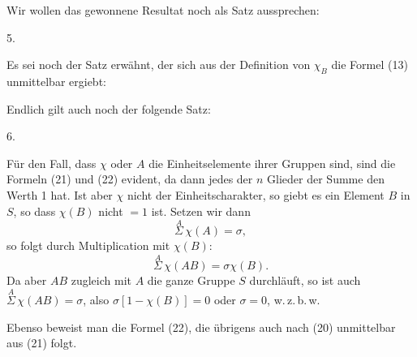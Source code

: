 
Wir wollen das gewonnene Resultat noch als Satz aussprechen:

5. 

Es sei noch der Satz erwähnt, der sich aus der Definition von $\chi_B$  die Formel (13) unmittelbar ergiebt:

Endlich gilt auch noch der folgende Satz:

6. 

Für den Fall, dass $\chi$ oder $A$ die Einheitselemente ihrer Gruppen sind, sind die Formeln (21) und (22) evident, da dann jedes der $n$ Glieder der Summe den Werth 1 hat. Ist aber $\chi$ nicht der Einheitscharakter, so giebt es ein Element $B$ in $S$, so dass $\chi(B)$ nicht $= 1$ ist. Setzen wir dann
\[
\overset{A}{\Sigma}\,\chi(A) = \sigma,
\]
so folgt durch Multiplication mit $\chi(B)$:
\[
\overset{A}{\Sigma}\,\chi(AB) = \sigma\chi(B).
\]
Da aber $AB$ zugleich mit $A$ die ganze Gruppe $S$ durchläuft, so ist auch $\overset{A}{\Sigma}\,\chi(AB) = \sigma$, also $\sigma[1 - \chi(B)] = 0$ oder $\sigma = 0$, w.\,z.\,b.\,w.

Ebenso beweist man die Formel (22), die übrigens auch nach (20) unmittelbar aus (21) folgt.
